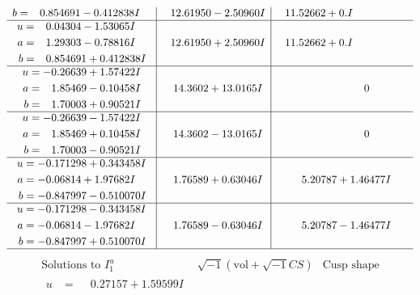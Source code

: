 \documentclass[1p]{elsarticle_modified}
\theoremstyle{definition}
\newcommand{\I}{\sqrt{-1}}
\begin{document}
$$\begin{array}{c|c|c}
\begin{aligned}
b &= \phantom{-}0.854691 - 0.412838 I\end{aligned}
 & \phantom{-}12.61950 - 2.50960 I & \phantom{-}11.52662 + 0. I\phantom{ +0.000000I} \\ \hline\begin{aligned}
u &= \phantom{-}0.04304 - 1.53065 I \\
a &= \phantom{-}1.29303 - 0.78816 I \\
b &= \phantom{-}0.854691 + 0.412838 I\end{aligned}
 & \phantom{-}12.61950 + 2.50960 I & \phantom{-}11.52662 + 0. I\phantom{ +0.000000I} \\ \hline\begin{aligned}
u &= -0.26639 + 1.57422 I \\
a &= \phantom{-}1.85469 - 0.10458 I \\
b &= \phantom{-}1.70003 + 0.90521 I\end{aligned}
 & \phantom{-}14.3602 + 13.0165 I & \phantom{-0.000000 } 0 \\ \hline\begin{aligned}
u &= -0.26639 - 1.57422 I \\
a &= \phantom{-}1.85469 + 0.10458 I \\
b &= \phantom{-}1.70003 - 0.90521 I\end{aligned}
 & \phantom{-}14.3602 - 13.0165 I & \phantom{-0.000000 } 0 \\ \hline\begin{aligned}
u &= -0.171298 + 0.343458 I \\
a &= -0.06814 + 1.97682 I \\
b &= -0.847997 - 0.510070 I\end{aligned}
 & \phantom{-}1.76589 + 0.63046 I & \phantom{-}5.20787 + 1.46477 I \\ \hline\begin{aligned}
u &= -0.171298 - 0.343458 I \\
a &= -0.06814 - 1.97682 I \\
b &= -0.847997 + 0.510070 I\end{aligned}
 & \phantom{-}1.76589 - 0.63046 I & \phantom{-}5.20787 - 1.46477 I\\
 \hline 
 \end{array}$$\newpage$$\begin{array}{c|c|c}  
\text{Solutions to }I^u_{1}& \I (\text{vol} + \sqrt{-1}CS) & \text{Cusp shape}\\
 \hline 
\begin{aligned}
u &= \phantom{-}0.27157 + 1.59599 I \\

\end{aligned}
\end{array}$$
\end{document}
